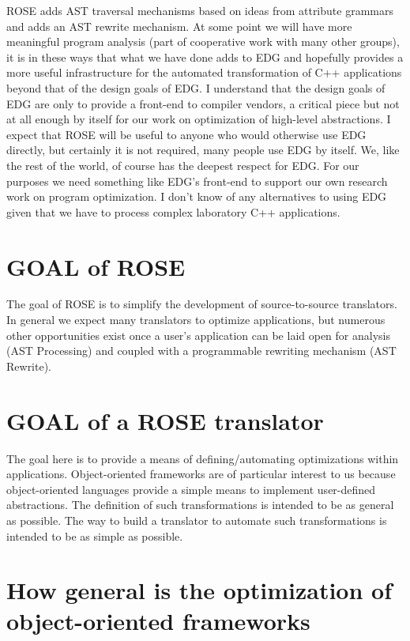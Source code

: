    ROSE adds AST traversal mechanisms based on ideas from attribute grammars
and adds an AST rewrite mechanism.  At some point we will have more meaningful
program analysis (part of cooperative work with many other groups), it is in 
these ways that what we have done adds to EDG and
hopefully provides a more useful infrastructure for the automated transformation of
C++ applications beyond that of the design goals of EDG.  I understand that the
design goals of EDG are only to provide a front-end to compiler vendors, a critical
piece but not at all enough by itself for our work on optimization of high-level 
abstractions.  I expect that ROSE will be useful to anyone who would otherwise use 
EDG directly, but certainly it is not required, many people use EDG by itself.
We, like the rest of the world, of course has the deepest respect for EDG.
For our purposes we need something like EDG's front-end to support our own research work
on program optimization. I don't know of any alternatives to using EDG given that 
we have to process complex laboratory C++ applications.

\section{GOAL of ROSE}
   The goal of ROSE is to simplify the development of source-to-source translators.
In general we expect many translators to optimize applications, but numerous
other opportunities exist once a user's application can be laid open for analysis
(AST Processing) and coupled with a programmable rewriting mechanism (AST Rewrite).

\section{GOAL of a ROSE translator}

   The goal here is to provide a means of defining/automating optimizations within
applications. Object-oriented frameworks are of particular interest to us because object-oriented
languages provide a simple means to implement user-defined abstractions.
The definition of such transformations is intended to be as general
as possible. The way to build a translator to automate such transformations
is intended to be as simple as possible.

\section{ How general is the optimization of object-oriented frameworks }

